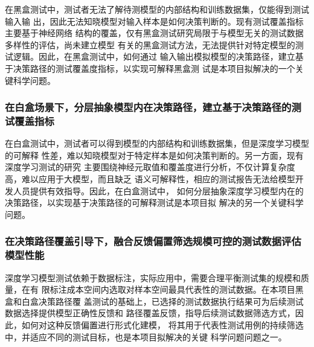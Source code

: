 在黑盒测试中，测试者无法了解待测模型的内部结构和训练数据集，仅能得到测试输入输
出，因此无法知晓模型对输入样本是如何决策判断的。现有测试覆盖指标主要基于神经网络
结构的覆盖，仅有黑盒测试研究局限于与模型无关的测试数据多样性的评估，尚未建立模型
有关的黑盒测试方法，无法提供针对特定模型的测试逻辑。因此，在黑盒测试中，如何通过
输入输出模拟模型的决策路径，建立基于决策路径的测试覆盖度指标，以实现可解释黑盒测
试是本项目拟解决的一个关键科学问题。


\subsubsection{在白盒场景下，分层抽象模型内在决策路径，建立基于决策路径的测试覆盖指标}

在白盒测试中，测试者可以得到模型的内部结构和训练数据集，但是深度学习模型的可解释
性差，难以知晓模型对于特定样本是如何决策判断的。另一方面，现有深度学习测试的研究
主要围绕神经元取值和覆盖度进行分析，不仅计算复杂度高，难以应用于大模型，而且缺乏
语义可解释性，相应的测试报告无法给模型开发人员提供有效指导。因此，在白盒测试中，
如何分层抽象深度学习模型内在的决策路径，以实现基于决策路径的可解释测试是本项目拟
解决的另一个关键科学问题。

\subsubsection{在决策路径覆盖引导下，融合反馈偏置筛选规模可控的测试数据评估模型性能}

深度学习模型测试依赖于数据标注，实际应用中，需要合理平衡测试集的规模和质量，在有
限标注成本空间内选取对样本空间最具代表性的测试数据。在本项目黑盒和白盒决策路径覆
盖测试的基础上，已选择的测试数据执行结果可为后续测试数据选择提供模型正确性反馈和
路径覆盖反馈，指导后续测试数据筛选方式，因此，如何对这种反馈偏置进行形式化建模，
将其用于代表性测试用例的持续筛选中，并适应不同的测试目标，也是本项目拟解决的关键
科学问题问题之一。